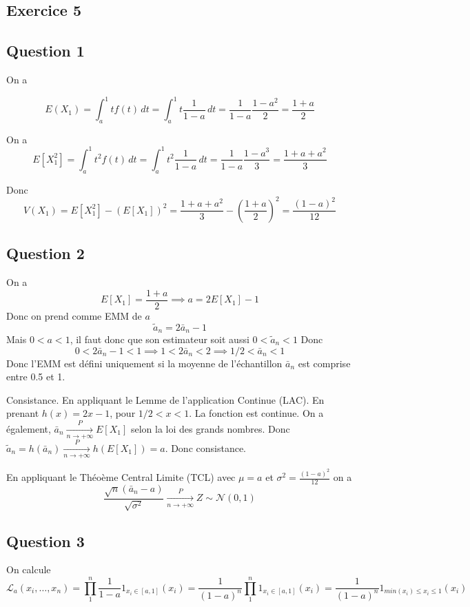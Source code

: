 \documentclass[]{book}
\theoremstyle{definition}
\begin{document}
\subsection*{Exercice 5}
\subsection*{Question 1}
On a

$$
E(X_1) = \int_{a}^{1}{t f(t) \,dt} = \int_{a}^{1}{t\frac{1}{1-a} \,dt} = \frac{1}{1-a}\frac{1-a^2}{2} = \frac{1+a}{2}
$$

On a
$$
E[X_1^2] = \int_{a}^{1}{t^2 f(t) \,dt} = \int_{a}^{1}{t^2\frac{1}{1-a} \,dt} = \frac{1}{1-a}\frac{1-a^3}{3} = \frac{1+a+a^2}{3}
$$

Donc
$$
V(X_1) = E[X_1^2]−(E[X_1])^2 = \frac{1+a+a^2}{3} -  \left( \frac{1+a}{2} \right)^2 = \frac{(1-a)^2}{12}
$$

\subsection*{Question 2}
On a
$$E[X_1] = \frac{1+a}{2} \implies a = 2E[X_1] - 1$$
Donc on prend comme EMM de $a$
$$
\tilde{a}_n = 2 \bar{a}_n - 1
$$
Mais $0 < a <1$, il faut donc que son estimateur soit aussi $0 < \tilde{a}_n <1$
Donc 
$$
0 < 2\bar{a}_n - 1 < 1 \implies 1 < 2\bar{a}_n < 2 \implies 1/2 < \bar{a}_n < 1
$$
Donc l'EMM est d\'efini uniquement si la moyenne de l'\'echantillon $\bar{a}_n$ est comprise entre 0.5 et 1. 

Consistance. En appliquant le Lemme de l'application Continue (LAC).
En prenant $h(x) = 2 x - 1$, pour $1/2 < x <1$. La fonction est continue. On a \'egalement, $\bar{a}_n \xrightarrow[n \to +\infty]{P} E[X_1]$ selon la loi des grands nombres. Donc $\tilde{a}_n = h(\bar{a}_n) \xrightarrow[n \to +\infty]{P} h(E[X_1]) = a$. Donc consistance.

En appliquant le Th\'eo\`eme Central Limite (TCL) avec $\mu = a$ et $\sigma^2 = \frac{(1-a)^2}{12}$ on a  
$$
\frac{\sqrt{n}(\bar{a}_n - a)}{\sqrt{\sigma^2}} \xrightarrow[n \to +\infty]{P} Z \sim \mathcal{N}(0,1)
$$

\subsection*{Question 3}
On calcule
$$
\mathcal{L}_a(x_i,\ldots,x_n) = \prod_{1}^{n}{\frac{1}{1-a}}1_{x_i \in [a,1]}(x_i) =
\frac{1}{(1-a)^n}\prod_{1}^{n}{1_{x_i \in [a,1]}(x_i)} = \frac{1}{(1-a)^n}{1_{min(x_i) \leq x_i \leq 1}(x_i)}
$$
\end{document}
